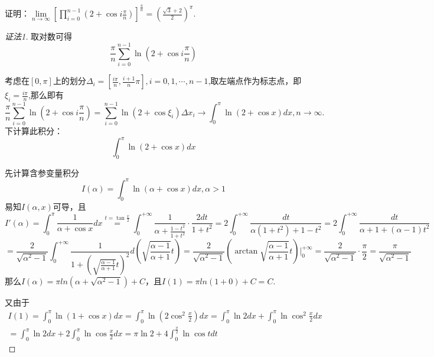 \documentclass[lang=cn,newtx,10pt,scheme=chinese]{elegantbook}
\begin{document}
\begin{example}
证明：$\lim\limits_{n \to \infty} \left[ \prod\limits_{i=0}^{n-1} \left(2 + \cos i \frac{\pi}{n}\right) \right]^{\frac{\pi}{n}} = \left(\frac{\sqrt{3}+2}{2}\right)^\pi$.
\end{example}

\begin{proof}[证法1]
    取对数可得
    $$
    \frac{\pi}{n} \sum\limits_{i=0}^{n-1} \ln\left(2 + \cos i \frac{\pi}{n}\right) 
    $$

    考虑在$[0,\pi]$上的划分$\Delta_i = [\frac{i \pi}{n},\frac{i+1}{n}\pi],i=0,1,\cdots,n-1$,取左端点作为标志点，即$\xi_i = \frac{i \pi}{n}$,那么即有 
    $$
    \frac{\pi}{n} \sum\limits_{i=0}^{n-1} \ln\left(2 + \cos i \frac{\pi}{n}\right) = \sum\limits_{i=0}^{n-1} \ln\left(2 + \cos \xi_i\right) \Delta x_i \rightarrow \int_0^\pi \ln\left(2 + \cos x\right) dx ,n \to \infty.
    $$
    下计算此积分：
    $$
    \int_0^\pi \ln\left(2 + \cos x\right) dx 
    $$

    先计算含参变量积分$$I(\alpha) = \int _0^{\pi} \ln(\alpha +\cos x)dx,\alpha > 1$$
    易知$I(\alpha,x)$可导，且
    $$ I'(\alpha) = \int_{0}^{\pi} \frac{1}{\alpha + \cos x} dx \stackrel{t=\tan\frac{x}{2}}{=} \int_{0}^{+\infty} \frac{1}{\alpha + \frac{1-t^2}{1+t^2}} \cdot \frac{2 dt}{1+t^2}  = 2 \int_{0}^{+\infty} \frac{dt}{\alpha(1+t^2) + 1-t^2} = 2 \int_{0}^{+\infty} \frac{dt}{\alpha+1 + (\alpha-1)t^2} $$
    $$ = \frac{2}{\sqrt{\alpha^2-1}} \int_{0}^{+\infty} \frac{1}{1 + \left(\sqrt{\frac{\alpha-1}{\alpha+1}}t\right)^2} d\left(\sqrt{\frac{\alpha-1}{\alpha+1}}t\right)  = \frac{2}{\sqrt{\alpha^2-1}} \left( \arctan \sqrt{\frac{\alpha-1}{\alpha+1}}t \right) \Bigg|_{0}^{+\infty} = \frac{2}{\sqrt{\alpha^2-1}} \cdot \frac{\pi}{2} = \frac{\pi}{\sqrt{\alpha^2-1}} $$
    那么$I(\alpha) = \pi ln(\alpha +\sqrt{\alpha^2 -1})+C$，且$I(1)=\pi ln(1+0)+C=C$.

    又由于
    \begin{align*}
                    I(1) = \int_{0}^{\pi} \ln(1+\cos x) dx = \int_{0}^{\pi} \ln\left(2\cos^2\frac{x}{2}\right) dx 
            = \int_{0}^{\pi} \ln 2 dx + \int_{0}^{\pi} \ln \cos^2\frac{x}{2} dx \\
            = \int_{0}^{\pi} \ln 2 dx + 2\int_{0}^{\pi} \ln \cos\frac{x}{2} dx 
            = \pi \ln 2 + 4 \int_{0}^{\frac{\pi}{2}} \ln \cos t dt
    \end{align*}


\end{proof}
\end{document}
